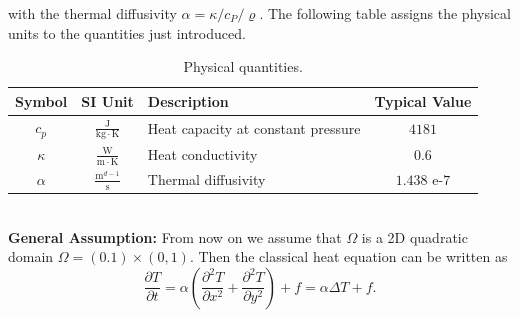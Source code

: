 \documentclass[a4paper,11pt]{article}
\theoremstyle{plain} %
\theoremstyle{definition} %
\theoremstyle{remark} %
\def\Temp{T}
\begin{document}
with the thermal diffusivity $\alpha = \kappa / c_P / \varrho $. The following table assigns the physical units to the quantities just introduced.
\begin{table}[h!] 
\centering
{ \renewcommand{\arraystretch}{1.4}
\begin{tabular}{cclc}
\toprule
\textbf{Symbol} & \textbf{SI Unit} & \textbf{Description}& \textbf{Typical Value}\\
\midrule
$c_p$ & $\tfrac{\mathrm{J}}{\mathrm{kg}\cdot\mathrm{K} }$ & Heat capacity at constant pressure &  $ 4181 $\\
$\kappa $ & $\tfrac{\mathrm{W}}{\mathrm{m}\cdot\mathrm{K} }$ & Heat conductivity & $ 0.6 $\\
$\alpha $ & $\tfrac{\mathrm{m}^{d-1}}{\mathrm{s} }$ &  Thermal diffusivity & $ 1.438$ e-$7 $\\
\bottomrule
\end{tabular}}
\caption{Physical quantities.}
\label{TableTypicalValues}
\end{table}
\\
\textbf{General Assumption:} From now on we assume that $\Omega $ is a  2D quadratic domain $\Omega = (0.1)\times (0,1)$. Then the classical heat equation can be written as
\begin{equation} \label{HeatEquation2D}
\frac{\partial \Temp}{\partial t} = \alpha \left( \frac{\partial^2 \Temp}{\partial x^2} + \frac{\partial^2 \Temp}{\partial y^2} \right) + f = \alpha \Delta \Temp + f .
\end{equation}
\end{document}
